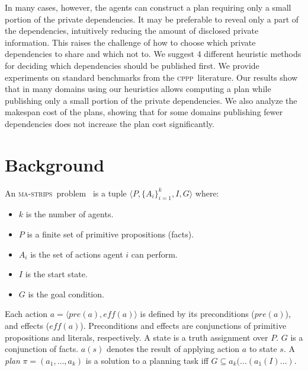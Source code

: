 \documentclass{article}
\newcommand{\cppp}{\textsc {cppp}\xspace}
\newcommand{\mastrips}{\textsc {ma-strips}\xspace}
\newcommand{\commentout}[1]{}
\theoremstyle{remark}
\newcommand{\citep}[1]{\cite{#1}}
\begin{document}
In many cases, however, the agents can construct a plan requiring only a small portion of the private dependencies. It may be preferable to reveal only a part of the dependencies, intuitively reducing the amount of disclosed private information. 
This raises the challenge of how to choose which private dependencies to share and which not to. 
We suggest 4 different heuristic methods for deciding which dependencies should be published first. %
We provide experiments on standard benchmarks from the \cppp\ literature. Our results show that in many domains using our heuristics allows computing a plan while publishing only a small portion of the private dependencies. 
We also analyze the makespan cost of the plans, showing that for some domains publishing fewer dependencies does not increase the plan cost significantly.


\section{Background} 


An \mastrips\ problem~\citep{BrafmanD13} is a tuple $\langle P, \{A_i\}_{i=1}^k, I ,G \rangle$ where:
\begin{itemize}
	\item $k$ is the number of agents.
	\item $P$ is a finite set of primitive propositions (facts).
    \item $A_i$ is the set of actions agent $i$ can perform. 
	\item $I$ is the start state.
	\item $G$ is the goal condition.	
\end{itemize} 
\commentout{$k$ is the number of agents, $P$ is a finite set of primitive propositions (facts), $A_i$ is the set of actions agent $i$ can perform, 
$I$ is the start state, and $G$ is the goal condition.	}


Each action $a=\langle pre(a), \mathit{eff}(a) \rangle$ is defined by its preconditions ($pre(a)$), and effects ($\mathit{eff}(a)$). Preconditions and effects are conjunctions of primitive propositions and literals, respectively. A state is a truth assignment over $P$.  $G$ is a conjunction of facts. $a(s)$ denotes the result of applying action $a$ to state $s$. A {\em plan} $\pi=(a_1,\ldots,a_k)$ is a solution to a planning task iff $G\subseteq a_k(\ldots(a_1(I)\ldots)$.
\end{document}

